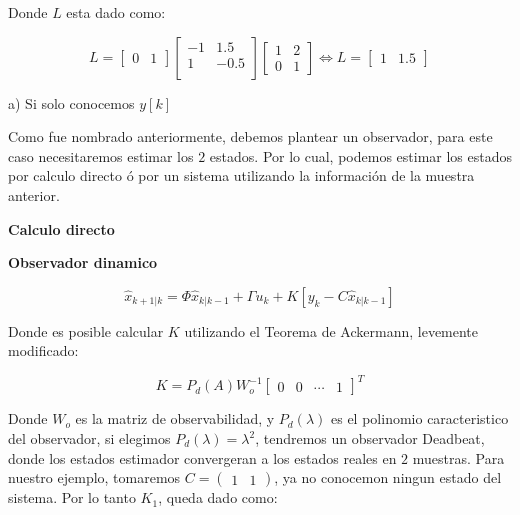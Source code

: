 Donde $L$ esta dado como: 

\begin{equation}
    L = \begin{bmatrix}
        0 & 1
    \end{bmatrix}
    \begin{bmatrix}
        -1 & 1.5 \\ 
        1 & -0.5 \\
    \end{bmatrix}
    \begin{bmatrix}
        1 & 2 \\ 
        0 & 1 
    \end{bmatrix} \Leftrightarrow
    L = \begin{bmatrix}
        1 & 1.5
    \end{bmatrix}
\end{equation}

a) Si solo conocemos $y[k]$

Como fue nombrado anteriormente, debemos plantear un observador, 
para este caso necesitaremos estimar los $2$ estados. Por lo cual, podemos 
estimar los estados por calculo directo ó por un sistema utilizando la información
de la muestra anterior. 

\textbf{Calculo directo}

\textbf{Observador dinamico}

\begin{equation}
    \label{eq:final-1-k}
    \hat{x}_{k+1|k} = 
    \Phi \hat{x}_{k|k-1} + \Gamma u_k +
    K [y_k - C\hat{x}_{k|k-1}]
\end{equation}

Donde es posible calcular $K$ utilizando el Teorema de Ackermann, levemente modificado: 

\begin{equation}
    K = P_d(A) W_o^{-1}
    \begin{bmatrix}
        0 & 0 & \cdots & 1
    \end{bmatrix}^T
\end{equation}

Donde $W_o$ es la matriz de observabilidad, y $P_d(\lambda)$ 
es el polinomio caracteristico del observador, si elegimos $P_d(\lambda)=\lambda^2$, 
tendremos un observador Deadbeat, donde los estados estimador convergeran a los estados 
reales en $2$ muestras. Para nuestro ejemplo, tomaremos $C=\begin{pmatrix}
    1 & 1
\end{pmatrix}$, ya no conocemon ningun estado del sistema. Por lo tanto $K_1$, queda dado 
como: 


